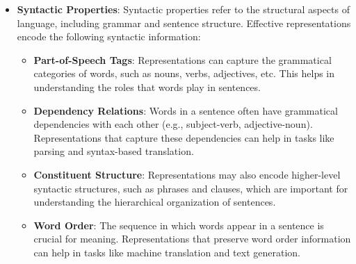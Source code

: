 \begin{itemize}
    \item \textbf{Syntactic Properties}: Syntactic properties refer to the structural aspects of language, including grammar and sentence structure. Effective representations encode the following syntactic information:
    \begin{itemize}
        \item \textbf{Part-of-Speech Tags}: Representations can capture the grammatical categories of words, such as nouns, verbs, adjectives, etc. This helps in understanding the roles that words play in sentences.
        \item \textbf{Dependency Relations}: Words in a sentence often have grammatical dependencies with each other (e.g., subject-verb, adjective-noun). Representations that capture these dependencies can help in tasks like parsing and syntax-based translation.
        \item \textbf{Constituent Structure}: Representations may also encode higher-level syntactic structures, such as phrases and clauses, which are important for understanding the hierarchical organization of sentences.
        \item \textbf{Word Order}: The sequence in which words appear in a sentence is crucial for meaning. Representations that preserve word order information can help in tasks like machine translation and text generation.
    \end{itemize}


\end{itemize}
